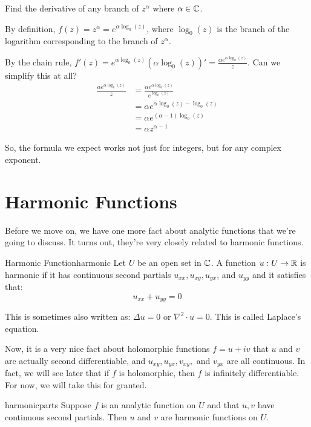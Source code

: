 \begin{ex}{}{} Find the derivative of any branch of $z^{\alpha}$ where $\alpha\in \mathbb{C}$.

By definition, $f(z) = z^{\alpha} = e^{\alpha\log_0(z)}$, where $\log_0(z)$ is the branch of the logarithm corresponding to the branch of $z^{\alpha}$.

By the chain rule, $f'(z) = e^{\alpha \log_0(z)} (\alpha\log_0(z))' = \frac{\alpha e^{\alpha\log_0(z)}}{z}$. Can we simplify this at all?
\begin{align*}\frac{\alpha e^{\alpha\log_0(z)}}{z} &= \frac{\alpha e^{\alpha \log_0(z)}}{e^{\log_0(z)}}\\
&= \alpha e^{\alpha \log_0(z) - \log_0(z)}\\
&= \alpha e^{(\alpha - 1)\log_0(z)}\\
&=\alpha z^{\alpha-1}
\end{align*}

So, the formula we expect works not just for integers, but for any complex exponent.
\end{ex}

\section{Harmonic Functions}

Before we move on, we have one more fact about analytic functions that we're going to discuss. It turns out, they're very closely related to harmonic functions.

\begin{defbo}{Harmonic Function}{harmonic}
Let $U$ be an open set in $\mathbb{C}$. A function $u:U\rightarrow \mathbb{R}$ is harmonic if it has continuous second partials $u_{xx}, u_{xy}, u_{yx}$, and $u_{yy}$ and it satisfies that:
$$u_{xx} + u_{yy} =0$$

This is sometimes also written as: $\Delta u = 0$ or $\nabla^2\cdot u = 0$. This is called Laplace's equation.
\end{defbo}

Now, it is a very nice fact about holomorphic functions $f = u + iv$ that $u$ and $v$ are actually second differentiable, and $u_{xy}, u_{yx}, v_{xy},$ and $v_{yx}$ are all continuous. In fact, we will see later that if $f$ is holomorphic, then $f$ is infinitely differentiable. For now, we will take this for granted.

\begin{thmbo}{}{harmonicparts} Suppose $f$ is an analytic function on $U$ and that $u,v$ have continuous second partials. Then $u$ and $v$ are harmonic functions on $U$.\end{thmbo}

